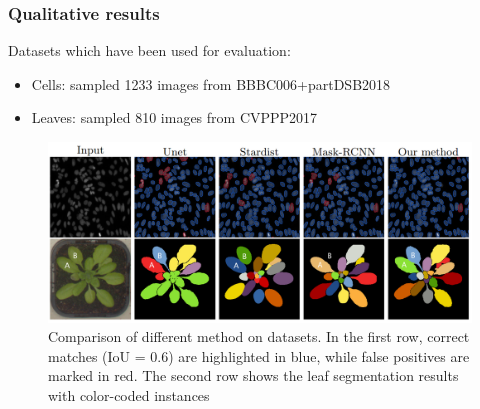 \documentclass{beamer}
\begin{document}
\begin{frame}
    \frametitle{Qualitative results }

    Datasets which have been used for evaluation:
    \begin{itemize}
        \item Cells: sampled 1233 images from BBBC006+partDSB2018
        \item Leaves: sampled 810 images from CVPPP2017
    \end{itemize}

    \begin{figure}[h]
        \includegraphics[height=0.5\textheight]{results_pict_comp.png}
        \caption{Comparison of different method on datasets.
            In the first row, correct matches (IoU = 0.6) are highlighted in
            blue, while false positives are marked in red. The second row shows the leaf
            segmentation results with color-coded instances}
    \end{figure}

\end{frame}
\end{document}
